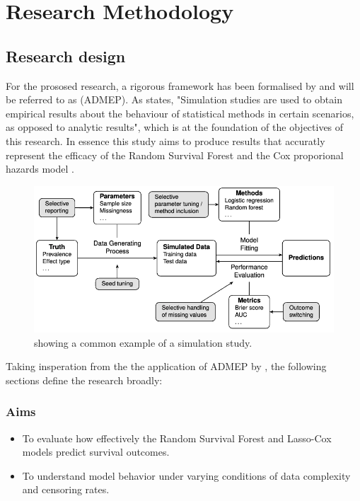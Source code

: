 \chapter{Research Methodology}
\label{Chapter2} %

\section{Research design} \label{design}
For the prososed research, a rigorous framework has been formalised by \parencite{morris_using_2019} and will be referred to as (ADMEP). As \parencite{morris_using_2019} states, "Simulation studies are used to obtain empirical results about the behaviour of statistical methods in certain scenarios, as opposed to analytic results", which is at the foundation of the objectives of this research. In essence this study aims to produce results that accuratly represent the efficacy of the Random Survival Forest \parencite{ishwaran_random_2008} and the Cox proporional hazards model \parencite{cox_regression_1972}. 

\begin{figure}[h]
	\centering
	\includegraphics[scale=0.48]{Figures/METHOD_GRAPH.png}
	\caption{\parencite{pawel_pitfalls_2024} showing a common example of a simulation study.}
\end{figure}

\noindent Taking insperation from the the application of ADMEP by \parencite{pawel_pitfalls_2024}, the following sections define the research broadly:

\subsection{Aims}
\begin{itemize}	
\item To evaluate how effectively the Random Survival Forest and Lasso-Cox models predict survival outcomes.
\item To understand model behavior under varying conditions of data complexity and censoring rates.
\end{itemize}


